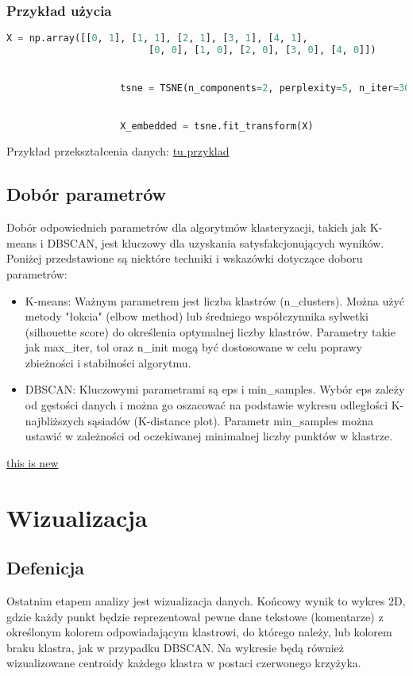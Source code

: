 			
		\subsubsection{Przykład użycia}
			\begin{lstlisting}[language=Python]
				X = np.array([[0, 1], [1, 1], [2, 1], [3, 1], [4, 1],
             			 [0, 0], [1, 0], [2, 0], [3, 0], [4, 0]])


					tsne = TSNE(n_components=2, perplexity=5, n_iter=300, random_state=0)


					X_embedded = tsne.fit_transform(X)
			\end{lstlisting}
			
			
			Przykład przekształcenia danych:
				\underline{tu przyklad}
		
	\subsection{Dobór parametrów}
		Dobór odpowiednich parametrów dla algorytmów klasteryzacji, takich jak K-means i DBSCAN, jest kluczowy dla uzyskania satysfakcjonujących wyników. Poniżej przedstawione są niektóre techniki i wskazówki dotyczące doboru parametrów:
		
		\begin{itemize}
			\item K-means: Ważnym parametrem jest liczba klastrów (n\_clusters). Można użyć metody "łokcia" (elbow method) lub średniego współczynnika sylwetki (silhouette score) do określenia optymalnej liczby klastrów. Parametry takie jak max\_iter, tol oraz n\_init mogą być dostosowane w celu poprawy zbieżności i stabilności algorytmu.
			\item DBSCAN: Kluczowymi parametrami są eps i min\_samples. Wybór eps zależy od gęstości danych i można go oszacować na podstawie wykresu odległości K-najbliższych sąsiadów (K-distance plot). Parametr min\_samples można ustawić w zależności od oczekiwanej minimalnej liczby punktów w klastrze.
		\end{itemize}
		
		\underline{this is new}
			
	
	
\section{Wizualizacja}
	\subsection{Defenicja}
		Ostatnim etapem analizy jest wizualizacja danych. Końcowy wynik to wykres 2D, gdzie każdy punkt będzie reprezentował pewne dane tekstowe (komentarze) z określonym kolorem odpowiadającym klastrowi, do którego należy, lub kolorem braku klastra, jak w przypadku DBSCAN. Na wykresie będą również wizualizowane centroidy każdego klastra w postaci czerwonego krzyżyka.
	
